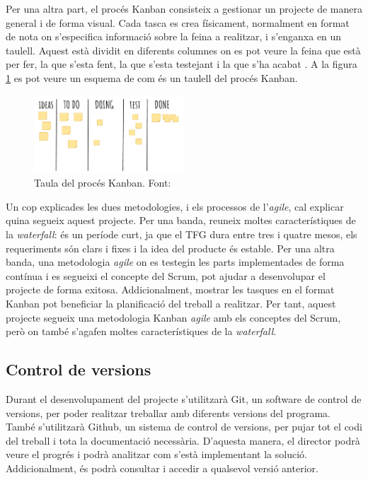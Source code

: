 \documentclass[a4paper]{article}
\begin{document}
Per una altra part, el procés Kanban consisteix a gestionar un projecte de manera general i de forma visual. Cada tasca es crea físicament, normalment en format de nota  on s'especifica informació sobre la feina a realitzar, i s'enganxa en un taulell. Aquest està dividit en diferents columnes on es pot veure la feina que està per fer, la que s'esta fent, la que s'esta testejant i la que s'ha acabat \cite{kanbanWeb}. A la figura \ref{fig:KanbanImage} es pot veure un esquema de com és un taulell del procés Kanban.

\begin{figure}[H]
    \centering
    \includegraphics[width=0.5\textwidth]{images/Kanban.png}
    \caption{Taula del procés Kanban. Font: \cite{kanbanImage}}
    \label{fig:KanbanImage}
\end{figure}

Un cop explicades les dues metodologies, i els processos de l'\textit{agile}, cal explicar quina segueix aquest projecte. Per una banda, reuneix moltes característiques de la \textit{waterfall}: és un període curt, ja que el TFG dura entre tres i quatre mesos, els requeriments són clars i fixes i la idea del producte és estable. Per una altra banda, una metodologia \textit{agile} on es testegin les parts implementades de forma contínua i es segueixi el concepte del Scrum, pot ajudar a desenvolupar el projecte de forma exitosa. Addicionalment, mostrar les tasques en el format Kanban pot beneficiar la planificació del treball a realitzar. Per tant, aquest projecte segueix una metodologia Kanban \textit{agile} amb els conceptes del Scrum, però on també s'agafen moltes característiques de la \textit{waterfall}.

\subsection{Control de versions}

Durant el desenvolupament del projecte s'utilitzarà Git, un software de control de versions, per poder realitzar treballar amb diferents versions del programa. També s'utilitzarà Github, un sistema de control de versions, per pujar tot el codi del treball i tota la documentació necessària. D'aquesta manera, el director podrà veure el progrés i podrà analitzar com s'està implementant la solució. Addicionalment, és podrà consultar i accedir a qualsevol versió anterior.
\end{document}
